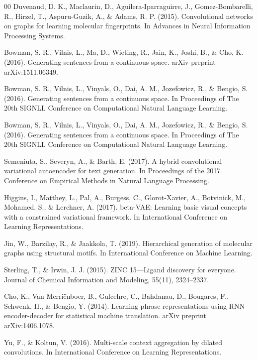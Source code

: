 \documentclass[conference]{IEEEtran}
\begin{document}
\begin{thebibliography}{00}
Duvenaud, D. K., Maclaurin, D., Aguilera-Iparraguirre, J., Gomez-Bombarelli, R., Hirzel, T., Aspuru-Guzik, A., \& Adams, R. P. (2015). Convolutional networks on graphs for learning molecular fingerprints. In Advances in Neural Information Processing Systems.

Bowman, S. R., Vilnis, L., Ma, D., Wieting, R., Jain, K., Joshi, B., \& Cho, K. (2016). Generating sentences from a continuous space. arXiv preprint arXiv:1511.06349.

Bowman, S. R., Vilnis, L., Vinyals, O., Dai, A. M., Jozefowicz, R., \& Bengio, S. (2016). Generating sentences from a continuous space. In Proceedings of The 20th SIGNLL Conference on Computational Natural Language Learning.

Bowman, S. R., Vilnis, L., Vinyals, O., Dai, A. M., Jozefowicz, R., \& Bengio, S. (2016). Generating sentences from a continuous space. In Proceedings of The 20th SIGNLL Conference on Computational Natural Language Learning.

Semeniuta, S., Severyn, A., \& Barth, E. (2017). A hybrid convolutional variational autoencoder for text generation. In Proceedings of the 2017 Conference on Empirical Methods in Natural Language Processing.

Higgins, I., Matthey, L., Pal, A., Burgess, C., Glorot-Xavier, A., Botvinick, M., Mohamed, S., \& Lerchner, A. (2017). beta-VAE: Learning basic visual concepts with a constrained variational framework. In International Conference on Learning Representations.

Jin, W., Barzilay, R., \& Jaakkola, T. (2019). Hierarchical generation of molecular graphs using structural motifs. In International Conference on Machine Learning.

Sterling, T., \& Irwin, J. J. (2015). ZINC 15---Ligand discovery for everyone. Journal of Chemical Information and Modeling, 55(11), 2324--2337.

Cho, K., Van Merriënboer, B., Gulcehre, C., Bahdanau, D., Bougares, F., Schwenk, H., \& Bengio, Y. (2014). Learning phrase representations using RNN encoder-decoder for statistical machine translation. arXiv preprint arXiv:1406.1078.

Yu, F., \& Koltun, V. (2016). Multi-scale context aggregation by dilated convolutions. In International Conference on Learning Representations.


\end{thebibliography}
\end{document}
